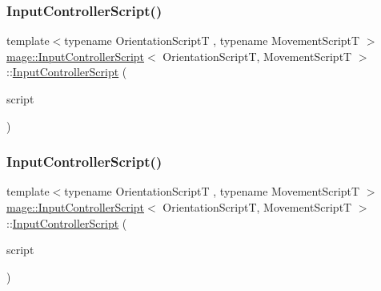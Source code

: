 \subsubsection{\texorpdfstring{Input\+Controller\+Script()}{InputControllerScript()}\hspace{0.1cm}{\footnotesize\ttfamily [2/3]}}
{\footnotesize\ttfamily template$<$typename Orientation\+ScriptT , typename Movement\+ScriptT $>$ \\
\hyperlink{classmage_1_1_input_controller_script}{mage\+::\+Input\+Controller\+Script}$<$ Orientation\+ScriptT, Movement\+ScriptT $>$\+::\hyperlink{classmage_1_1_input_controller_script}{Input\+Controller\+Script} (\begin{DoxyParamCaption}\item[{const \hyperlink{classmage_1_1_input_controller_script}{Input\+Controller\+Script}$<$ Orientation\+ScriptT, Movement\+ScriptT $>$ \&}]{script }\end{DoxyParamCaption})\hspace{0.3cm}{\ttfamily [delete]}}

\hypertarget{classmage_1_1_input_controller_script_a18b905c7a204c22173dcaf19a9587f7d}{}\label{classmage_1_1_input_controller_script_a18b905c7a204c22173dcaf19a9587f7d} 
\subsubsection{\texorpdfstring{Input\+Controller\+Script()}{InputControllerScript()}\hspace{0.1cm}{\footnotesize\ttfamily [3/3]}}
{\footnotesize\ttfamily template$<$typename Orientation\+ScriptT , typename Movement\+ScriptT $>$ \\
\hyperlink{classmage_1_1_input_controller_script}{mage\+::\+Input\+Controller\+Script}$<$ Orientation\+ScriptT, Movement\+ScriptT $>$\+::\hyperlink{classmage_1_1_input_controller_script}{Input\+Controller\+Script} (\begin{DoxyParamCaption}\item[{\hyperlink{classmage_1_1_input_controller_script}{Input\+Controller\+Script}$<$ Orientation\+ScriptT, Movement\+ScriptT $>$ \&\&}]{script }\end{DoxyParamCaption})}

